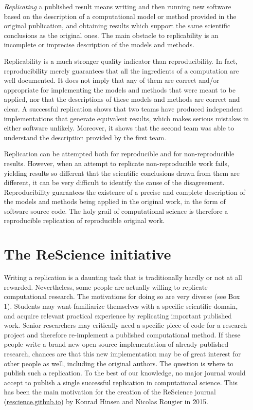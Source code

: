 \documentclass[a4paper,10pt, twocolumn]{article}
\begin{document}
\textit{Replicating} a published result means writing and then running
new software based on the description of a computational model or
method provided in the original publication, and obtaining results
which support the same scientific conclusions as the original
ones. The main obstacle to replicability is an incomplete or imprecise
description of the models and methods.

Replicability is a much stronger quality indicator than
reproducibility. In fact, reproducibility merely guarantees that all
the ingredients of a computation are well documented. It does not
imply that any of them are correct and/or appropriate for implementing
the models and methods that were meant to be applied, nor that the
descriptions of these models and methods are correct and clear. A
successful replication shows that two teams have produced independent
implementations that generate equivalent results, which makes serious
mistakes in either software unlikely. Moreover, it shows that the
second team was able to understand the description provided by the
first team.

Replication can be attempted both for reproducible and for
non-reproducible results. However, when an attempt to replicate
non-reproducible work fails, yielding results so different that the
scientific conclusions drawn from them are different, it can be very
difficult to identify the cause of the disagreement. Reproducibility
guarantees the existence of a precise and complete description of the
models and methods being applied in the original work, in the form of
software source code. The holy grail of computational science is
therefore a reproducible replication of reproducible original work.


\section*{The ReScience initiative}

Writing a replication is a daunting task that is traditionally hardly or not
at all rewarded. Nevertheless, some people are actually willing to replicate
computational research. The motivations for doing so are very diverse (see Box 1). Students may want familiarize themselves with
a specific scientific domain, and acquire relevant practical experience by replicating important published work. Senior researchers may critically
need a specific piece of code for a research project and therefore re-implement a published computational method. If these people write a brand new
open source implementation of already published research, chances are that this new
implementation may be of great interest for other people as well, including
the original authors. The question is where to publish such a replication. To the
best of our knowledge, no major journal would accept to publish a single successful
replication in computational science. This has been the main motivation for the
creation of the ReScience journal (\url{rescience.github.io}) by Konrad Hinsen
and Nicolas Rougier in 2015.\\
\end{document}
